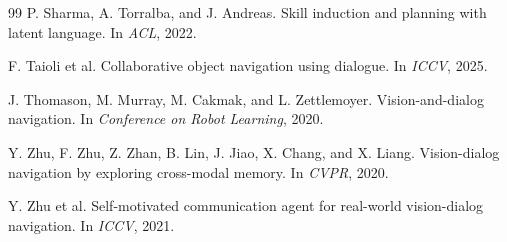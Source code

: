 \documentclass[10pt]{article}
\begin{document}
\begin{thebibliography}{99}
P. Sharma, A. Torralba, and J. Andreas.
\newblock Skill induction and planning with latent language.
\newblock In \emph{ACL}, 2022.

F. Taioli et al.
\newblock Collaborative object navigation using dialogue.
\newblock In \emph{ICCV}, 2025.

J. Thomason, M. Murray, M. Cakmak, and L. Zettlemoyer.
\newblock Vision-and-dialog navigation.
\newblock In \emph{Conference on Robot Learning}, 2020.

Y. Zhu, F. Zhu, Z. Zhan, B. Lin, J. Jiao, X. Chang, and X. Liang.
\newblock Vision-dialog navigation by exploring cross-modal memory.
\newblock In \emph{CVPR}, 2020.

Y. Zhu et al.
\newblock Self-motivated communication agent for real-world vision-dialog
navigation.
\newblock In \emph{ICCV}, 2021.

\end{thebibliography}
\end{document}
